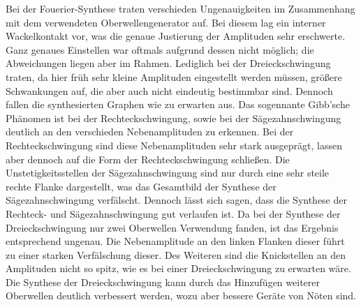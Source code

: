 Bei der Fouerier-Synthese traten verschieden Ungenauigkeiten im Zusammenhang mit dem verwendeten Oberwellengenerator auf. 
Bei diesem lag ein interner Wackelkontakt vor, was die genaue Justierung der Amplituden sehr erschwerte. Ganz genaues
Einstellen war oftmals aufgrund dessen nicht möglich; die Abweichungen liegen aber im Rahmen. Lediglich bei der Dreieckschwingung
traten, da hier früh sehr kleine Amplituden eingestellt werden müssen, größere Schwankungen auf, die aber auch nicht eindeutig 
bestimmbar sind. Dennoch fallen die synthesierten Graphen wie zu erwarten aus. Das sogennante Gibb'sche Phänomen ist bei der 
Rechteckschwingung, sowie bei der Sägezahnschwingung deutlich an den verschieden Nebenamplituden zu erkennen.
Bei der Rechteckschwingung sind diese Nebenamplituden sehr stark ausgeprägt, lassen aber dennoch auf die Form der Rechteckschwingung schließen.
Die Unstetigkeitsstellen der Sägezahnschwingung sind nur durch eine sehr steile rechte Flanke dargestellt, was 
das Gesamtbild der Synthese der Sägezahnschwingung verfälscht. Dennoch lässt sich sagen, dass die Synthese der Rechteck- und Sägezahnschwingung
gut verlaufen ist.
Da bei der Synthese der Dreieckschwingung nur zwei Oberwellen Verwendung fanden, ist das Ergebnis entsprechend ungenau.
Die Nebenamplitude an den linken Flanken dieser führt zu einer starken Verfälschung dieser. Des Weiteren sind die 
Knickstellen an den Amplituden nicht so spitz, wie es bei einer Dreieckschwingung zu erwarten wäre. Die Synthese der 
Dreieckschwingung kann durch das Hinzufügen weiterer Oberwellen deutlich verbessert werden, wozu aber bessere Geräte von Nöten sind.


